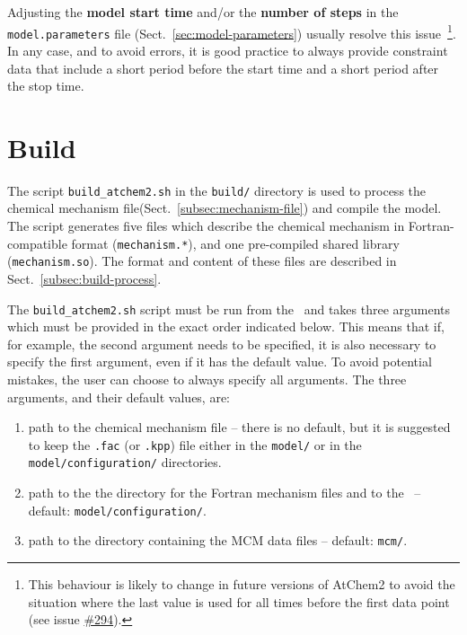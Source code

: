 Adjusting the \textbf{model start time} and/or the \textbf{number of steps}
in the \texttt{model.parameters} file (Sect.~\ref{sec:model-parameters})
usually resolve this issue~\footnote{This behaviour is likely to change
  in future versions of AtChem2 to avoid the situation where
  the last value is used for all times before the first data point
  (see issue \href{https://github.com/AtChem/AtChem2/issues/294}{\#294}).}.
In any case, and to avoid errors, it is good practice to always
provide constraint data that include a short period before the start
time and a short period after the stop time.

\section{Build} \label{sec:build}

The script \texttt{build\_atchem2.sh} in the \texttt{build/} directory is
used to process the chemical mechanism file(Sect.~\ref{subsec:mechanism-file})
and compile the model. The script generates five files which describe
the chemical mechanism in Fortran-compatible format
(\texttt{mechanism.*}), and one pre-compiled shared library
(\texttt{mechanism.so}). The format and content of these files are
described in Sect.~\ref{subsec:build-process}.

The \texttt{build\_atchem2.sh} script must be run from the \maindir\
and takes three arguments which must be provided in the exact order
indicated below. This means that if, for example, the second argument
needs to be specified, it is also necessary to specify the first
argument, even if it has the default value. To avoid potential
mistakes, the user can choose to always specify all arguments. The
three arguments, and their default values, are:

\begin{enumerate}
\item path to the chemical mechanism file -- there is no default, but
  it is suggested to keep the \texttt{.fac} (or \texttt{.kpp}) file
  either in the \texttt{model/} or in the
  \texttt{model/configuration/} directories.
\item path to the the directory for the Fortran mechanism files and to
  the \sharedir\ -- default: \texttt{model/configuration/}.
\item path to the directory containing the MCM data files -- default:
  \texttt{mcm/}.
\end{enumerate}

